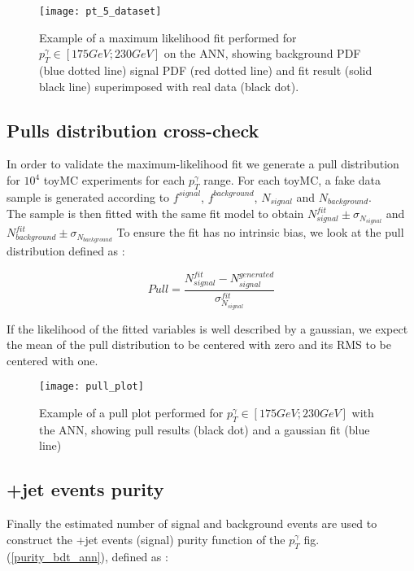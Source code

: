 \begin{figure}[h!]
\centering
    \texttt{[image: pt\_5\_dataset]}
    \caption{Example of a maximum likelihood fit performed for $p_T^\gamma \in [ 175 GeV ; 230 GeV ]$ on the ANN, showing background
    PDF (blue dotted line) signal PDF (red dotted line) and fit result (solid black line) superimposed with real data (black dot).}
    \label{pt_5_dataset}
\end{figure}

\subsection{Pulls distribution cross-check}

In order to validate the maximum-likelihood fit we generate a pull distribution for 
$10^4$ toyMC experiments for each $p_T^\gamma$ range. For each toyMC, a fake data sample is generated according to
$f^{signal}$, $f^{background}$, $N_{signal}$ and $N_{background}$.\\
The sample is then fitted with the same fit model to obtain $N^{fit}_{signal} \pm \sigma_{N_{signal}}$ and
$N^{fit}_{background} \pm \sigma_{N_{background}}$
To ensure the fit has no intrinsic bias, we look at the pull distribution defined as :

\begin{equation}
Pull = \frac{N^{fit}_{signal}-N^{generated}_{signal}}{\sigma^{fit}_{N_{signal}}}
\end{equation}

If the likelihood of the fitted variables is well described by a gaussian, we expect the mean of the pull distribution
to be centered with zero and its RMS to be centered with one.

\begin{figure}[h!]
\centering
    \texttt{[image: pull\_plot]}
    \caption{Example of a pull plot performed for $p_T^\gamma \in [ 175 GeV ; 230 GeV ]$ with the ANN, showing pull
    results (black dot) and a gaussian fit (blue line)}
    \label{pull_plot}
\end{figure}

\subsection{\textgamma+jet events purity}

Finally the estimated number of signal and background events are used to construct the \textgamma+jet
events (signal) purity function of the $p_T^\gamma$ fig. (\ref{purity_bdt_ann}), defined as :

